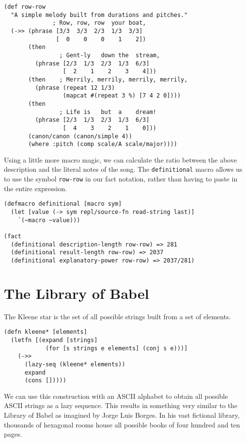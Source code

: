\documentclass[numbers]{sigplanconf}
\begin{document}
\begin{verbatim}
(def row-row
  "A simple melody built from durations and pitches."
              ; Row, row, row  your boat,
  (->> (phrase [3/3  3/3  2/3  1/3  3/3]
               [  0    0    0    1    2])
       (then
                ; Gent-ly   down the  stream,
         (phrase [2/3  1/3  2/3  1/3  6/3]
                 [  2    1    2    3    4]))
       (then    ; Merrily, merrily, merrily, merrily,
         (phrase (repeat 12 1/3)
                 (mapcat #(repeat 3 %) [7 4 2 0])))
       (then
                ; Life is   but  a    dream!
         (phrase [2/3  1/3  2/3  1/3  6/3]
                 [  4    3    2    1    0]))
       (canon/canon (canon/simple 4))
       (where :pitch (comp scale/A scale/major))))
\end{verbatim}

Using a little more macro magic, we can calculate the ratio between the above description and the literal notes
of the song. The \verb|definitional| macro allows us to use the symbol \verb|row-row| in our fact notation, rather than
having to paste in the entire expression.

\begin{verbatim}
(defmacro definitional [macro sym]
  (let [value (-> sym repl/source-fn read-string last)]
    `(~macro ~value)))

(fact
  (definitional description-length row-row) => 281
  (definitional result-length row-row) => 2037
  (definitional explanatory-power row-row) => 2037/281)
\end{verbatim}

\section{The Library of Babel}

The Kleene star is the set of all possible strings built from a set of elements.

\begin{verbatim}
(defn kleene* [elements]
  (letfn [(expand [strings]
            (for [s strings e elements] (conj s e)))]
    (->>
      (lazy-seq (kleene* elements))
      expand
      (cons []))))
\end{verbatim}

We can use this construction with an ASCII alphabet to obtain all possible ASCII strings as a lazy
sequence. This results in something very similar to the Library of Babel as imagined by Jorge Luis Borges. In his
vast fictional library, thousands of hexagonal rooms house all possible books of four hundred and ten pages.
\end{document}
